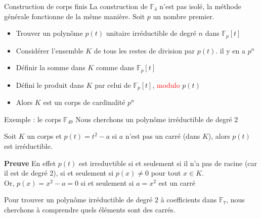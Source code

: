 \begin{parag}{Construction de corps finis}
    La construction de $\mathbb{F}_4$ n'est pas isolé, la méthode générale fonctionne de la même manière. Soit $p$ un nombre premier.
    \begin{itemize}
        \item Trouver un polynôme $p(t)$ unitaire irréductible de degré $n$ dans $\mathbb{F}_p[t]$
        \item Considérer l'ensemble $K$ de tous les restes de division par $p(t)$. il y en a $p^n$
        \item Définir la somme dans $K$ comme dans $\mathbb{F}_p[t]$
        \item Défini le produit dans $K$ par celui de $\mathbb{F}_p[t]$, \textcolor{red}{modulo} $p(t)$
        \item Alors $K$ est un corps de cardinalité $p^n$
    \end{itemize}

    \begin{subparag}{Exemple : le corps $\mathbb{F}_{49}$}
        Nous cherchons un polynôme irréductible de degré $2$
        \begin{proposition}
            Soit $K$ un corps et $p(t) = t^2 - a$ si $a$ n'est pas un carré (dans $K$), alors $p(t)$ est irréductible.
        \end{proposition}
        \textbf{Preuve}
        En effet $p(t)$ est irreduvtible si et seulement si il n'a pas de racine (car il est de degré 2), si et seulement si $p(x) \neq 0$ pour tout $x \in K$.
        \\
        Or, $p(x) = x^2 - a = 0$ si et seulement si $a = x^2$ est un carré
        \begin{framedremark}
            Pour trouver un polynôme irréductible de degré $2$ à coefficients dans $\mathbb{F}_7$, nous cherchons à comprendre quels éléments sont des carrés.
        \end{framedremark}


\end{subparag}
\end{parag}
